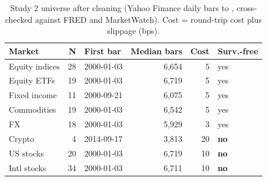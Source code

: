 \begin{table}[!t]
\centering
\caption{Study 2 universe after cleaning (Yahoo Finance daily bars to \STwoLast{}, cross-checked against FRED and MarketWatch). Cost = round-trip cost plus slippage (bps).}
\label{tab:s2data}
\footnotesize
\begin{tabular}{l r l r r l}
\toprule
Market & N & First bar & Median bars & Cost & Surv.-free \\
\midrule
Equity indices & 28 & 2000-01-03 & 6,654 & 5 & yes \\
Equity ETFs & 19 & 2000-01-03 & 6,719 & 5 & yes \\
Fixed income & 11 & 2000-09-21 & 6,075 & 5 & yes \\
Commodities & 19 & 2000-01-03 & 6,542 & 5 & yes \\
FX & 18 & 2000-01-03 & 5,929 & 3 & yes \\
Crypto & 4 & 2014-09-17 & 3,813 & 20 & \textbf{no} \\
US stocks & 20 & 2000-01-03 & 6,719 & 10 & \textbf{no} \\
Intl stocks & 34 & 2000-01-03 & 6,711 & 10 & \textbf{no} \\
\bottomrule
\end{tabular}
\end{table}
